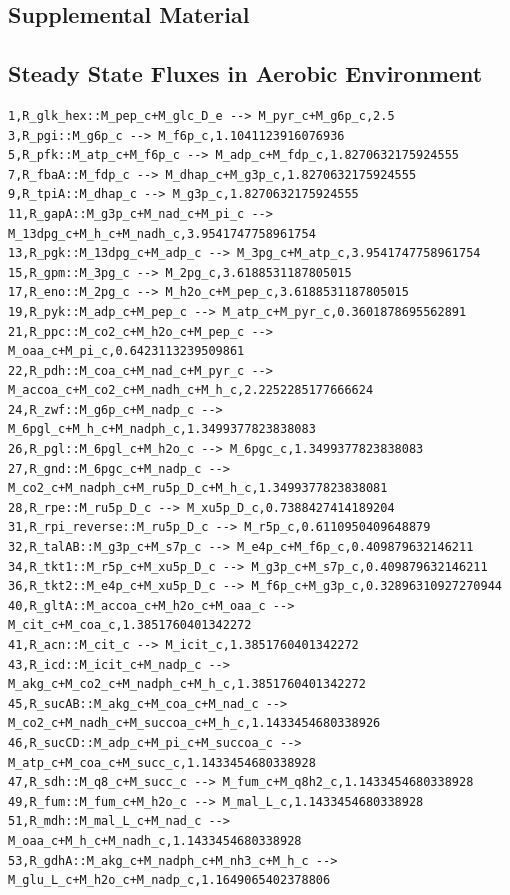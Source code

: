 \documentclass{article}
\begin{document}
\newpage
 

\newpage
\begin{landscape}
\section*{Supplemental Material}
\subsection*{Steady State Fluxes in Aerobic Environment}

\begin{verbatim}
1,R_glk_hex::M_pep_c+M_glc_D_e --> M_pyr_c+M_g6p_c,2.5
3,R_pgi::M_g6p_c --> M_f6p_c,1.1041123916076936
5,R_pfk::M_atp_c+M_f6p_c --> M_adp_c+M_fdp_c,1.8270632175924555
7,R_fbaA::M_fdp_c --> M_dhap_c+M_g3p_c,1.8270632175924555
9,R_tpiA::M_dhap_c --> M_g3p_c,1.8270632175924555
11,R_gapA::M_g3p_c+M_nad_c+M_pi_c --> M_13dpg_c+M_h_c+M_nadh_c,3.9541747758961754
13,R_pgk::M_13dpg_c+M_adp_c --> M_3pg_c+M_atp_c,3.9541747758961754
15,R_gpm::M_3pg_c --> M_2pg_c,3.6188531187805015
17,R_eno::M_2pg_c --> M_h2o_c+M_pep_c,3.6188531187805015
19,R_pyk::M_adp_c+M_pep_c --> M_atp_c+M_pyr_c,0.3601878695562891
21,R_ppc::M_co2_c+M_h2o_c+M_pep_c --> M_oaa_c+M_pi_c,0.6423113239509861
22,R_pdh::M_coa_c+M_nad_c+M_pyr_c --> M_accoa_c+M_co2_c+M_nadh_c+M_h_c,2.2252285177666624
24,R_zwf::M_g6p_c+M_nadp_c --> M_6pgl_c+M_h_c+M_nadph_c,1.3499377823838083
26,R_pgl::M_6pgl_c+M_h2o_c --> M_6pgc_c,1.3499377823838083
27,R_gnd::M_6pgc_c+M_nadp_c --> M_co2_c+M_nadph_c+M_ru5p_D_c+M_h_c,1.3499377823838081
28,R_rpe::M_ru5p_D_c --> M_xu5p_D_c,0.7388427414189204
31,R_rpi_reverse::M_ru5p_D_c --> M_r5p_c,0.6110950409648879
32,R_talAB::M_g3p_c+M_s7p_c --> M_e4p_c+M_f6p_c,0.409879632146211
34,R_tkt1::M_r5p_c+M_xu5p_D_c --> M_g3p_c+M_s7p_c,0.409879632146211
36,R_tkt2::M_e4p_c+M_xu5p_D_c --> M_f6p_c+M_g3p_c,0.32896310927270944
40,R_gltA::M_accoa_c+M_h2o_c+M_oaa_c --> M_cit_c+M_coa_c,1.3851760401342272
41,R_acn::M_cit_c --> M_icit_c,1.3851760401342272
43,R_icd::M_icit_c+M_nadp_c --> M_akg_c+M_co2_c+M_nadph_c+M_h_c,1.3851760401342272
45,R_sucAB::M_akg_c+M_coa_c+M_nad_c --> M_co2_c+M_nadh_c+M_succoa_c+M_h_c,1.1433454680338926
46,R_sucCD::M_adp_c+M_pi_c+M_succoa_c --> M_atp_c+M_coa_c+M_succ_c,1.1433454680338928
47,R_sdh::M_q8_c+M_succ_c --> M_fum_c+M_q8h2_c,1.1433454680338928
49,R_fum::M_fum_c+M_h2o_c --> M_mal_L_c,1.1433454680338928
51,R_mdh::M_mal_L_c+M_nad_c --> M_oaa_c+M_h_c+M_nadh_c,1.1433454680338928
53,R_gdhA::M_akg_c+M_nadph_c+M_nh3_c+M_h_c --> M_glu_L_c+M_h2o_c+M_nadp_c,1.1649065402378806

\end{verbatim}
\end{landscape}
\end{document}
